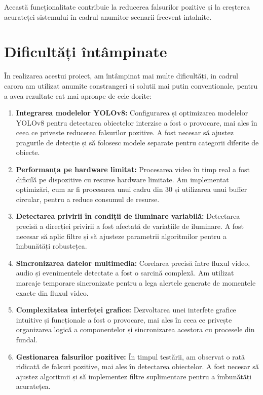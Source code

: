 \documentclass[12pt,a4paper]{article}
\begin{document}
Această funcționalitate contribuie la reducerea falsurilor pozitive și la creșterea acurateței sistemului în cadrul anumitor scenarii frecvent intalnite.

\section{Dificultăți întâmpinate}

În realizarea acestui proiect, am întâmpinat mai multe dificultăți, in cadrul carora am utilizat anumite constrangeri si solutii mai putin conventionale, pentru a avea rezultate cat mai aproape de cele dorite:

\begin{enumerate}
    \item \textbf{Integrarea modelelor YOLOv8:} Configurarea și optimizarea modelelor YOLOv8 pentru detectarea obiectelor interzise a fost o provocare, mai ales în ceea ce privește reducerea falsurilor pozitive. A fost necesar să ajustez pragurile de detecție și să folosesc modele separate pentru categorii diferite de obiecte.

    \item \textbf{Performanța pe hardware limitat:} Procesarea video în timp real a fost dificilă pe dispozitive cu resurse hardware limitate. Am implementat optimizări, cum ar fi procesarea unui cadru din 30 și utilizarea unui buffer circular, pentru a reduce consumul de resurse.

    \item \textbf{Detectarea privirii în condiții de iluminare variabilă:} Detectarea precisă a direcției privirii a fost afectată de variațiile de iluminare. A fost necesar să aplic filtre și să ajusteze parametrii algoritmilor pentru a îmbunătăți robustețea.

    \item \textbf{Sincronizarea datelor multimedia:} Corelarea precisă între fluxul video, audio și evenimentele detectate a fost o sarcină complexă. Am utilizat marcaje temporare sincronizate pentru a lega alertele generate de momentele exacte din fluxul video.

    \item \textbf{Complexitatea interfeței grafice:} Dezvoltarea unei interfețe grafice intuitive și funcționale a fost o provocare, mai ales în ceea ce privește organizarea logică a componentelor și sincronizarea acestora cu procesele din fundal.

    \item \textbf{Gestionarea falsurilor pozitive:} În timpul testării, am observat o rată ridicată de falsuri pozitive, mai ales în detectarea obiectelor. A fost necesar să ajustez algoritmii și să implementez filtre suplimentare pentru a îmbunătăți acuratețea.


\end{enumerate}
\end{document}
